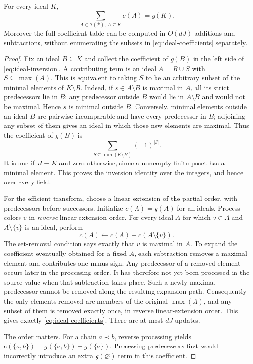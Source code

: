 \begin{lemma}
\label{lem:ideal-inversion}
For every ideal $K$,
\begin{equation}\label{eq:ideal-inversion}
                 \sum_{A\in\mathcal I(\mathcal P),\,A\subseteq K}
                                   c(A)=g(K).
\end{equation}
Moreover the full coefficient table can be computed in $O(dJ)$ additions
and subtractions, without enumerating the subsets in
\eqref{eq:ideal-coefficients} separately.
\end{lemma}
\begin{proof}
Fix an ideal $B\subseteq K$ and collect the coefficient of $g(B)$ in the
left side of \eqref{eq:ideal-inversion}.  A contributing term is an ideal
$A=B\cup S$ with $S\subseteq\max(A)$.  This is equivalent to taking
$S$ to be an arbitrary subset of the minimal elements of $K\setminus B$.
Indeed, if $s\in A\setminus B$ is maximal in $A$, all its strict
predecessors lie in $B$: any predecessor outside $B$ would lie in
$A\setminus B$ and would not be maximal.  Hence $s$ is minimal outside
$B$.  Conversely, minimal elements outside an ideal $B$ are pairwise
incomparable and have every predecessor in $B$; adjoining any subset of
them gives an ideal in which those new elements are maximal.  Thus the
coefficient of $g(B)$ is
\[
             \sum_{S\subseteq\min(K\setminus B)}(-1)^{|S|}.
\]
It is one if $B=K$ and zero otherwise, since a nonempty finite poset
has a minimal element.  This proves the inversion identity over the
integers, and hence over every field.

For the efficient transform, choose a linear extension of the partial
order, with predecessors before successors.  Initialize $c(A)=g(A)$ for
all ideals.  Process colors $v$ in \emph{reverse} linear-extension order.
For every ideal $A$ for which $v\in A$ and $A\setminus\{v\}$ is an
ideal, perform
\begin{equation}\label{eq:restricted-transform}
                  c(A)\leftarrow c(A)-c(A\setminus\{v\}).
\end{equation}
The set-removal condition says exactly that $v$ is maximal in $A$.
To expand the coefficient eventually obtained for a fixed $A$, each
subtraction removes a maximal element and contributes one minus sign.
Any predecessor of a removed element occurs later in the processing order.
It has therefore not yet been processed in the source value when that
subtraction takes place.  Such a newly maximal predecessor cannot be
removed along the resulting expansion path.  Consequently the only
elements removed are members of the original $\max(A)$, and any subset
of them is removed exactly once, in reverse linear-extension order.
This gives exactly \eqref{eq:ideal-coefficients}.  There are at most $dJ$
updates.

The order matters.  For a chain $a\prec b$, reverse processing yields
$c(\{a,b\})=g(\{a,b\})-g(\{a\})$.  Processing predecessors first would
incorrectly introduce an extra $g(\varnothing)$ term in this coefficient.
\end{proof}

